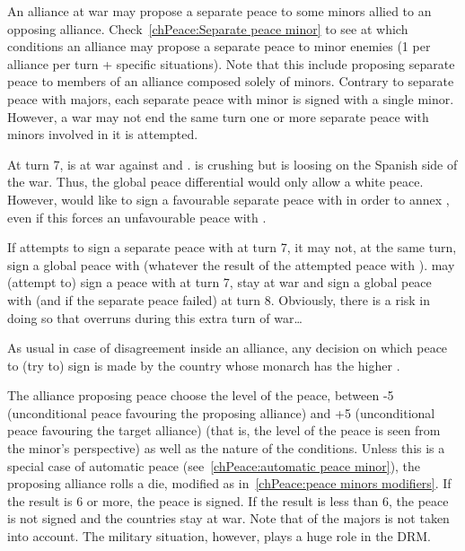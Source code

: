  An alliance at war may propose a separate peace to
some minors allied to an opposing alliance.
\bparag Check~\ref{chPeace:Separate peace minor} to see at which conditions an
alliance may propose a separate peace to minor enemies (1 per alliance per
turn + specific situations).
\bparag Note that this include proposing separate peace to members of an
alliance composed solely of minors.
\bparag Contrary to separate peace with majors, each separate peace with minor
is signed with a single minor. However, a war may not end the same turn one or
more separate peace with minors involved in it is attempted.

\begin{exemple}
  At turn 7, \FRA is at war against \HIS and \paysSavoie. \FRA is crushing
  \paysSavoie but is loosing on the Spanish side of the war. Thus, the global
  peace differential would only allow a white peace. However, \FRA would like
  to sign a favourable separate peace with \paysSavoie in order to annex
  \provinceBresse, even if this forces an unfavourable peace with \HIS.

  If \FRA attempts to sign a separate peace with \paysSavoie at turn 7, it may
  not, at the same turn, sign a global peace with \HIS (whatever the result of
  the attempted peace with \paysSavoie). \FRA may (attempt to) sign a peace
  with \paysSavoie at turn 7, stay at war and sign a global peace with \HIS
  (and \paysSavoie if the separate peace failed) at turn 8. Obviously, there
  is a risk in doing so that \HIS overruns \FRA during this extra turn of
  war\ldots
\end{exemple}

\aparag[Disagreement] As usual in case of disagreement inside an alliance, any
decision on which peace to (try to) sign is made by the country whose monarch
has the higher \DIP.

\aparag[Method]
\bparag The alliance proposing peace choose the level of the peace, between -5
(unconditional peace favouring the proposing alliance) and +5 (unconditional
peace favouring the target alliance) (that is, the level of the peace is seen
from the minor's perspective) as well as the nature of the conditions.
\bparag Unless this is a special case of automatic peace
(see~\ref{chPeace:automatic peace minor}), the proposing alliance rolls a die,
modified as in~\ref{chPeace:peace minors modifiers}.
\bparag If the result is 6 or more, the peace is signed.
\bparag If the result is less than 6, the peace is not signed and the
countries stay at war.
\bparag Note that \STAB of the majors is not taken into account. The military
situation, however, plays a huge role in the DRM.


